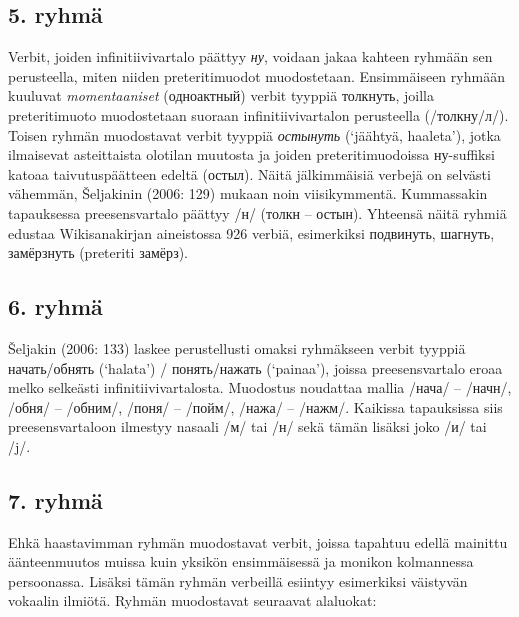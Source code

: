 \documentclass[]{scrreprt}
\begin{document}
\subsection{5. ryhmä}\label{ryhmuxe4-4}

Verbit, joiden infinitiivivartalo päättyy \emph{ну}, voidaan jakaa
kahteen ryhmään sen perusteella, miten niiden preteritimuodot
muodostetaan. Ensimmäiseen ryhmään kuuluvat \emph{momentaaniset}
(одноактный) verbit tyyppiä толкнуть, joilla preteritimuoto muodostetaan
suoraan infinitiivivartalon perusteella (/толкну/л/). Toisen ryhmän
muodostavat verbit tyyppiä \emph{остынуть} (`jäähtyä, haaleta'), jotka
ilmaisevat asteittaista olotilan muutosta ja joiden preteritimuodoissa
ну-suffiksi katoaa taivutuspäätteen edeltä (остыл). Näitä jälkimmäisiä
verbejä on selvästi vähemmän, Šeljakinin (2006: 129) mukaan noin
viisikymmentä. Kummassakin tapauksessa preesensvartalo päättyy /н/
(толкн -- остын). Yhteensä näitä ryhmiä edustaa Wikisanakirjan
aineistossa 926 verbiä, esimerkiksi подвинуть, шагнуть, замёрзнуть
(preteriti замёрз).

\subsection{6. ryhmä}\label{ryhmuxe4-5}

Šeljakin (2006: 133) laskee perustellusti omaksi ryhmäkseen verbit
tyyppiä начать/обнять (`halata') / понять/нажать (`painaa'), joissa
preesensvartalo eroaa melko selkeästi infinitiivivartalosta. Muodostus
noudattaa mallia /нача/ -- /начн/, /обня/ -- /обним/, /поня/ -- /пойм/,
/нажа/ -- /нажм/. Kaikissa tapauksissa siis preesensvartaloon ilmestyy
nasaali /м/ tai /н/ sekä tämän lisäksi joko /и/ tai /j/.

\subsection{7. ryhmä}\label{ryhmuxe4-6}

Ehkä haastavimman ryhmän muodostavat verbit, joissa tapahtuu edellä
mainittu äänteenmuutos muissa kuin yksikön ensimmäisessä ja monikon
kolmannessa persoonassa. Lisäksi tämän ryhmän verbeillä esiintyy
esimerkiksi väistyvän vokaalin ilmiötä. Ryhmän muodostavat seuraavat
alaluokat:
\end{document}
